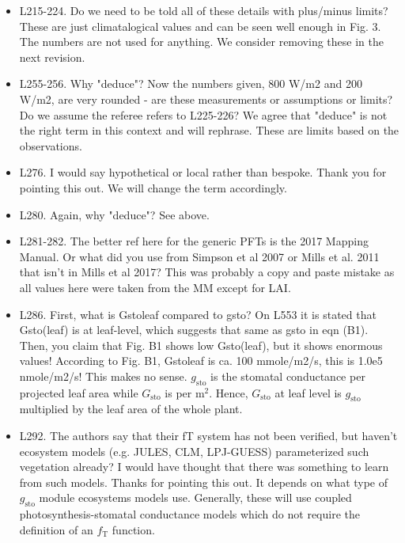 \documentclass{scrartcl}
\begin{document}
\begin{itemize}
\item {\color{blue}L215-224. Do we need to be told all of these details with plus/minus limits? These are just climatalogical values and can be seen well enough in Fig. 3. The numbers are not used for anything.}
We consider removing these in the next revision.

\item {\color{blue}L255-256. Why "deduce"? Now the numbers given, 800 W/m2 and 200 W/m2, are very rounded - are these measurements or assumptions or limits?}
Do we assume the referee refers to L225-226? We agree that "deduce" is not the right term in this context and will rephrase. These are limits based on the observations.

\item {\color{blue}L276. I would say hypothetical or local rather than bespoke.}
Thank you for pointing this out. We will change the term accordingly.

\item {\color{blue}L280. Again, why "deduce"?}
See above.

\item {\color{blue}L281-282. The better ref here for the generic PFTs is the 2017 Mapping Manual. Or what did you use from Simpson et al 2007 or Mills et al. 2011 that isn't in Mills et al 2017?}
This was probably a copy and paste mistake as all values here were taken from the MM except for LAI.

\item {\color{blue}L286. First, what is Gstoleaf compared to gsto? On L553 it is stated that Gsto(leaf) is at leaf-level, which suggests that same as gsto in eqn (B1). Then, you claim that Fig. B1 shows low Gsto(leaf), but it shows enormous values! According to Fig. B1, Gstoleaf is ca. 100 mmole/m2/s, this is 1.0e5 nmole/m2/s! This makes no sense.}
$g_\mathrm{sto}$ is the stomatal conductance per projected leaf area while $G_\mathrm{sto}$ is per $\mathrm{m}^2$. Hence, $G_\mathrm{sto}$ at leaf level is $g_\mathrm{sto}$ multiplied by the leaf area of the whole plant.

\item {\color{blue}L292. The authors say that their fT system has not been verified, but haven't ecosystem models (e.g. JULES, CLM, LPJ-GUESS) parameterized such vegetation already? I would have thought that there was something to learn from such models.}
Thanks for pointing this out. It depends on what type of $g_\mathrm{sto}$ module ecosystems models use. Generally, these will use coupled photosynthesis-stomatal conductance models which do not require the definition of an $f_\mathrm{T}$ function.


\end{itemize}
\end{document}
